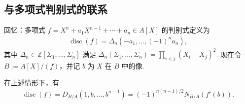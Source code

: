\subsection{与多项式判别式的联系}\label{sec:nt-2-4-4}
回忆：多项式 $f=X^n+a_1X^{n-1}+\cdots+a_n\in A[X]$ 的判别式定义为
\begin{align*}
\operatorname{disc}(f)=\Delta_n(-a_1,\ldots,(-1)^na_n),
\end{align*}
其中 $\Delta_n\in\mathbb Z[\Sigma_1,\ldots,\Sigma_n]$ 满足
$\Delta_n(\Sigma_1,\ldots,\Sigma_n)=\prod_{i<j}(X_i-X_j)^2$.
现在令 $B:=A[X]/(f)$，并记 $b$ 为 $X$ 在 $B$ 中的像.
\begin{proposition*}
在上述情形下，有
\begin{align*}
\operatorname{disc}(f)=D_{B/A}(1,b,\ldots,b^{n-1})
=(-1)^{n(n-1)/2}N_{B/A}(f'(b)).
\end{align*}
\end{proposition*}

